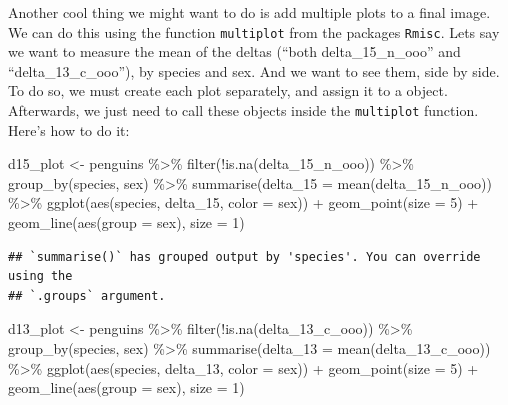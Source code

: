 \documentclass[
]{book}
\newenvironment{Shaded}{\begin{snugshade}}{\end{snugshade}}
\newcommand{\AttributeTok}[1]{\textcolor[rgb]{0.77,0.63,0.00}{#1}}
\newcommand{\DecValTok}[1]{\textcolor[rgb]{0.00,0.00,0.81}{#1}}
\newcommand{\FunctionTok}[1]{\textcolor[rgb]{0.00,0.00,0.00}{#1}}
\newcommand{\NormalTok}[1]{#1}
\newcommand{\OtherTok}[1]{\textcolor[rgb]{0.56,0.35,0.01}{#1}}
\newcommand{\SpecialCharTok}[1]{\textcolor[rgb]{0.00,0.00,0.00}{#1}}
\begin{document}
Another cool thing we might want to do is add multiple plots to a final image.
We can do this using the function \texttt{multiplot} from the packages \texttt{Rmisc}.
Lets say we want to measure the mean of the deltas (``both delta\_15\_n\_ooo'' and ``delta\_13\_c\_ooo''), by species and sex.
And we want to see them, side by side.
To do so, we must create each plot separately, and assign it to a object.
Afterwards, we just need to call these objects inside the \texttt{multiplot} function.
Here's how to do it:

\begin{Shaded}
\begin{Highlighting}[]
\NormalTok{d15\_plot }\OtherTok{\textless{}{-}}\NormalTok{ penguins }\SpecialCharTok{\%\textgreater{}\%} 
  \FunctionTok{filter}\NormalTok{(}\SpecialCharTok{!}\FunctionTok{is.na}\NormalTok{(delta\_15\_n\_ooo)) }\SpecialCharTok{\%\textgreater{}\%} 
  \FunctionTok{group\_by}\NormalTok{(species, sex) }\SpecialCharTok{\%\textgreater{}\%} 
  \FunctionTok{summarise}\NormalTok{(}\AttributeTok{delta\_15 =} \FunctionTok{mean}\NormalTok{(delta\_15\_n\_ooo)) }\SpecialCharTok{\%\textgreater{}\%} 
  \FunctionTok{ggplot}\NormalTok{(}\FunctionTok{aes}\NormalTok{(species, delta\_15, }\AttributeTok{color =}\NormalTok{ sex)) }\SpecialCharTok{+}
  \FunctionTok{geom\_point}\NormalTok{(}\AttributeTok{size =} \DecValTok{5}\NormalTok{) }\SpecialCharTok{+}
  \FunctionTok{geom\_line}\NormalTok{(}\FunctionTok{aes}\NormalTok{(}\AttributeTok{group =}\NormalTok{ sex), }\AttributeTok{size =} \DecValTok{1}\NormalTok{)}
\end{Highlighting}
\end{Shaded}

\begin{verbatim}
## `summarise()` has grouped output by 'species'. You can override using the
## `.groups` argument.
\end{verbatim}

\begin{Shaded}
\begin{Highlighting}[]
\NormalTok{d13\_plot }\OtherTok{\textless{}{-}}\NormalTok{ penguins }\SpecialCharTok{\%\textgreater{}\%} 
  \FunctionTok{filter}\NormalTok{(}\SpecialCharTok{!}\FunctionTok{is.na}\NormalTok{(delta\_13\_c\_ooo)) }\SpecialCharTok{\%\textgreater{}\%} 
  \FunctionTok{group\_by}\NormalTok{(species, sex) }\SpecialCharTok{\%\textgreater{}\%} 
  \FunctionTok{summarise}\NormalTok{(}\AttributeTok{delta\_13 =} \FunctionTok{mean}\NormalTok{(delta\_13\_c\_ooo)) }\SpecialCharTok{\%\textgreater{}\%} 
  \FunctionTok{ggplot}\NormalTok{(}\FunctionTok{aes}\NormalTok{(species, delta\_13, }\AttributeTok{color =}\NormalTok{ sex)) }\SpecialCharTok{+}
  \FunctionTok{geom\_point}\NormalTok{(}\AttributeTok{size =} \DecValTok{5}\NormalTok{) }\SpecialCharTok{+}
  \FunctionTok{geom\_line}\NormalTok{(}\FunctionTok{aes}\NormalTok{(}\AttributeTok{group =}\NormalTok{ sex), }\AttributeTok{size =} \DecValTok{1}\NormalTok{)}
\end{Highlighting}
\end{Shaded}
\end{document}
